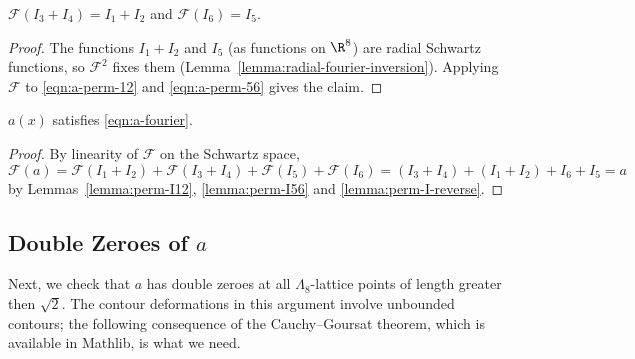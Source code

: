 \begin{lemma}\label{lemma:perm-I-reverse}\leanok
$\mathcal{F}(I_3 + I_4) = I_1 + I_2$ and $\mathcal{F}(I_6) = I_5$.
\end{lemma}
\begin{proof}\leanok
The functions $I_1 + I_2$ and $I_5$ (as functions on $\R^8$) are radial Schwartz functions, so $\mathcal{F}^2$ fixes them (Lemma~\ref{lemma:radial-fourier-inversion}). Applying $\mathcal{F}$ to \eqref{eqn:a-perm-12} and \eqref{eqn:a-perm-56} gives the claim.
\end{proof}

\begin{proposition}\label{prop:a-fourier}
\leanok
$a(x)$ satisfies \eqref{eqn:a-fourier}.
\end{proposition}
\begin{proof}\leanok
By linearity of $\mathcal{F}$ on the Schwartz space,
\[
    \mathcal{F}(a) = \mathcal{F}(I_1 + I_2) + \mathcal{F}(I_3 + I_4) + \mathcal{F}(I_5) + \mathcal{F}(I_6)
    = (I_3 + I_4) + (I_1 + I_2) + I_6 + I_5 = a
\]
by Lemmas~\ref{lemma:perm-I12}, \ref{lemma:perm-I56} and \ref{lemma:perm-I-reverse}.
\end{proof}

\subsection{Double Zeroes of $a$}

Next, we check that $a$ has double zeroes at all $\Lambda_8$-lattice points of length greater then $\sqrt{2}$.
The contour deformations in this argument involve unbounded contours; the following consequence of the Cauchy--Goursat theorem, which is available in Mathlib, is what we need.

